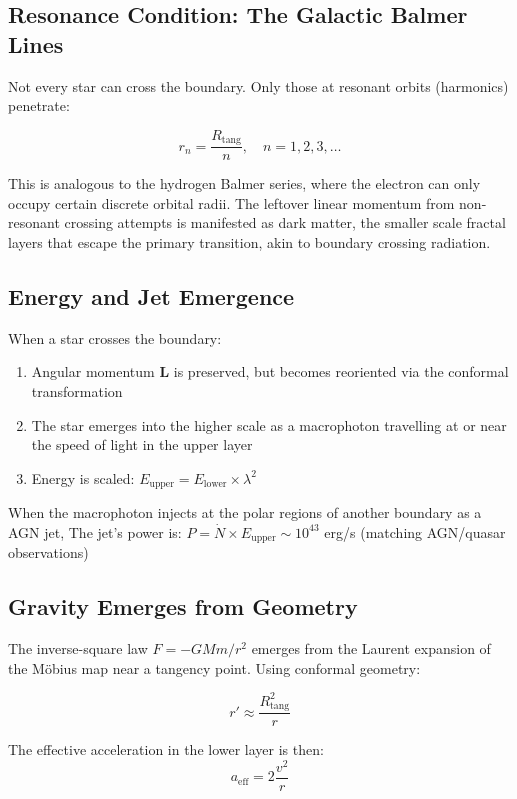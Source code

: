 \documentclass[11pt,a4paper]{article}
\begin{document}
  \subsection{Resonance Condition: The Galactic Balmer Lines}

    Not every star can cross the boundary. Only those at resonant orbits (harmonics) penetrate:

    \[
    r_n = \frac{R_{\text{tang}}}{n}, \quad n = 1, 2, 3, \ldots
    \]

    This is analogous to the hydrogen Balmer series, where the electron can only occupy certain discrete orbital radii. The leftover linear momentum from non-resonant crossing attempts is manifested as dark matter, the smaller scale fractal layers that escape the primary transition, akin to boundary crossing radiation.

  \subsection{Energy and Jet Emergence}

    When a star crosses the boundary:
    \begin{enumerate}
    \item Angular momentum $\mathbf{L}$ is preserved, but becomes reoriented via the conformal transformation
    \item The star emerges into the higher scale as a macrophoton travelling at or near the speed of light in the upper layer
    \item Energy is scaled: $E_{\text{upper}} = E_{\text{lower}} \times \lambda^2$
    
    \end{enumerate}
    When the macrophoton injects at the polar regions of another boundary as a AGN jet, The jet's power is: $P = \dot{N} \times E_{\text{upper}} \sim 10^{43}$ erg/s (matching AGN/quasar observations)

  \subsection{Gravity Emerges from Geometry}

    The inverse-square law $F = -GMm/r^2$ emerges from the Laurent expansion of the Möbius map near a tangency point. Using conformal geometry:

    \[
    r' \approx \frac{R_{\text{tang}}^2}{r}
    \]

    The effective acceleration in the lower layer is then:
    \[
    a_{\text{eff}} = 2\frac{v^2}{r}
    \]
\end{document}
